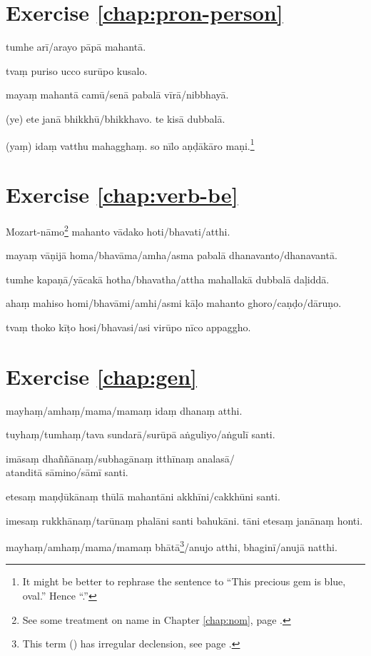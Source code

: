 \section*{Exercise \ref{chap:pron-person}}
\begin{answerkey}
\item tumhe ar\=i/arayo p\=ap\=a mahant\=a.
\item tva\d m puriso ucco sur\=upo kusalo.
\item maya\d m mahant\=a cam\=u/sen\=a pabal\=a v\=ir\=a/nibbhay\=a.
\item (ye) ete jan\=a bhikkh\=u/bhikkhavo. te kis\=a dubbal\=a.
\item (ya\d m) ida\d m vatthu mahaggha\d m. so n\=ilo a\d n\d d\=ak\=aro ma\d ni.\footnote{It might be better to rephrase the sentence to ``This precious gem is blue, oval.'' Hence ``.''}
\end{answerkey}

\section*{Exercise \ref{chap:verb-be}}
\begin{answerkey}
\item Mozart-n\=amo\footnote{See some treatment on name in Chapter \ref{chap:nom}, page \pageref{par:foreignname}.} mahanto v\=adako hoti/bhavati/atthi.
\item maya\d m v\=a\d nij\=a homa/bhav\=ama/amha/asma pabal\=a dhanavanto/dhanavant\=a.
\item tumhe kapa\d n\=a/y\=acak\=a hotha/bhavatha/attha mahallak\=a dubbal\=a da\d lidd\=a.
\item aha\d m mahiso homi/bhav\=ami/amhi/asmi k\=a\d lo mahanto ghoro/ca\d n\d do/d\=aru\d no.
\item tva\d m thoko k\=i\d to hosi/bhavasi/asi vir\=upo n\=ico appaggho.
\end{answerkey}

\section*{Exercise \ref{chap:gen}}
\begin{answerkey}
\item mayha\d m/amha\d m/mama/mama\d m ida\d m dhana\d m atthi.
\item tuyha\d m/tumha\d m/tava sundar\=a/sur\=up\=a a\.nguliyo/a\.ngul\=i santi.
\item im\=asa\d m dha\~n\~n\=ana\d m/subhag\=ana\d m itth\=ina\d m analas\=a/\\atandit\=a s\=amino/s\=am\=i santi.
\item etesa\d m ma\d n\d d\=uk\=ana\d m th\=ul\=a mahant\=ani akkh\=ini/cakkh\=uni santi.
\item imesa\d m rukkh\=ana\d m/tar\=una\d m phal\=ani santi bahuk\=ani. t\=ani etesa\d m jan\=ana\d m honti.
\item mayha\d m/amha\d m/mama/mama\d m bh\=at\=a\footnote{This term () has irregular declension, see page \pageref{decl:pitu}.}/anujo atthi, bhagin\=i/anuj\=a natthi.
\end{answerkey}

